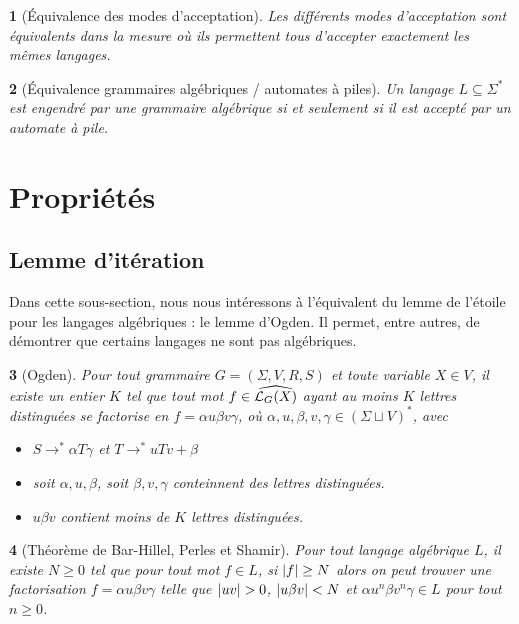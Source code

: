 \documentclass[10pt,a4paper,notitlepage]{article}
\theoremstyle{plain}
\newtheorem{thm}{\protect\theoremname}
\theoremstyle{definition}
\theoremstyle{definition}
\theoremstyle{remark}
\theoremstyle{remark}
\theoremstyle{plain}
\newtheorem{lem}[thm]{\protect\lemmaname}
\theoremstyle{plain}
\newtheorem{prop}[thm]{\protect\propositionname}
\theoremstyle{plain}
\newtheorem{cor}[thm]{\protect\corollaryname}
\theoremstyle{remark}
\providecommand{\corollaryname}{Corollaire}
\providecommand{\lemmaname}{Lemme}
\providecommand{\propositionname}{Proposition}
\providecommand{\theoremname}{Théorème}
\begin{document}
\begin{prop}[Équivalence des modes d'acceptation]
	Les différents modes d'acceptation sont équivalents dans la mesure où ils permettent tous d'accepter exactement les mêmes langages.	
\end{prop}

\begin{thm}[Équivalence grammaires algébriques / automates à piles]\label{th:equiv}
	Un langage $L\subseteq\Sigma^*$ est engendré par une grammaire algébrique si et seulement si il est accepté par un automate à pile.	
\end{thm}

\section{Propriétés}

\subsection{Lemme d'itération} %

Dans cette sous-section, nous nous intéressons à l'équivalent du lemme de l'étoile pour les langages algébriques : le lemme d'Ogden. Il permet, entre autres, de démontrer que certains langages ne sont pas algébriques.

\begin{lem}[Ogden]\label{th:ogden}
	Pour tout grammaire $G=(\Sigma,V,R,S)$ et toute variable $X\in V$, il existe un entier $K$ tel que tout mot $f\in \widehat{\mathcal{L}_G(X)}$ ayant au moins $K$ lettres distinguées se factorise en $f=\alpha u \beta v \gamma$, où $\alpha,u,\beta,v,\gamma\in (\Sigma\sqcup V)^*$, avec
	\begin{itemize}
		\item $S\to^*\alpha T \gamma$ et $T\to ^*uTv+\beta$
		\item soit $\alpha, u, \beta$, soit $\beta, v, \gamma$ conteinnent des lettres distinguées.
		\item $u\beta v$ contient moins de $K$ lettres distinguées.
	\end{itemize}
\end{lem}

\begin{cor}[Théorème de Bar-Hillel, Perles et Shamir]\label{th:bhs}
	Pour tout langage algébrique $L$, il existe $N\ge 0$ tel que pour tout mot $f\in L$, si $\left|f\right|\ge N$ alors on peut trouver une factorisation $f=\alpha u \beta v \gamma$ telle que $\abs{uv}>0$, $\left|u\beta v\right|<N$ et $\alpha u^n \beta v^n \gamma\in L$ pour tout $n\ge 0$.	
\end{cor}
\end{document}
